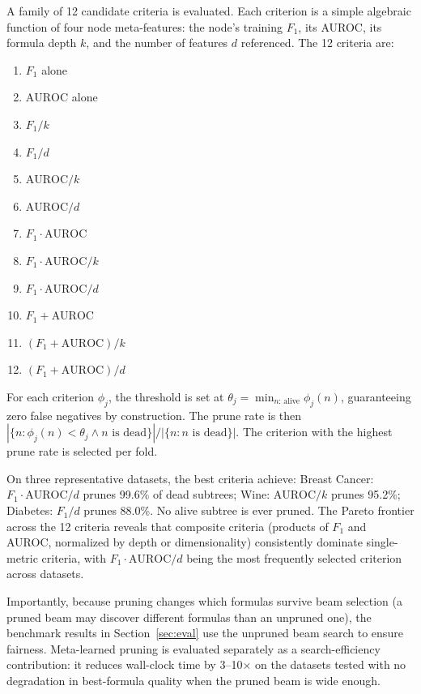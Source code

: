 \documentclass[journal]{IEEEtran}
\begin{document}
A family of 12 candidate criteria is evaluated.  Each criterion is a
simple algebraic function of four node meta-features: the node's
training $F_1$, its AUROC, its formula depth $k$, and the number of
features $d$ referenced.  The 12 criteria are:
\begin{enumerate}
\setlength{\itemsep}{0pt}
\item $F_1$ alone
\item $\text{AUROC}$ alone
\item $F_1 / k$
\item $F_1 / d$
\item $\text{AUROC} / k$
\item $\text{AUROC} / d$
\item $F_1 \cdot \text{AUROC}$
\item $F_1 \cdot \text{AUROC} / k$
\item $F_1 \cdot \text{AUROC} / d$
\item $F_1 + \text{AUROC}$
\item $(F_1 + \text{AUROC}) / k$
\item $(F_1 + \text{AUROC}) / d$
\end{enumerate}
For each criterion $\phi_j$, the threshold is set at
$\theta_j = \min_{n:\,\text{alive}} \phi_j(n)$, guaranteeing zero
false negatives by construction.  The prune rate is then
$|\{n : \phi_j(n) < \theta_j \land n\text{ is dead}\}| / |\{n : n\text{ is dead}\}|$.
The criterion with the highest prune rate is selected per fold.

On three representative datasets, the best criteria achieve:
Breast Cancer: $F_1 \cdot \text{AUROC}/d$ prunes 99.6\% of dead
subtrees; Wine: $\text{AUROC}/k$ prunes 95.2\%; Diabetes:
$F_1/d$ prunes 88.0\%.  No alive subtree is ever pruned.  The
Pareto frontier across the 12 criteria reveals that composite
criteria (products of $F_1$ and AUROC, normalized by depth or
dimensionality) consistently dominate single-metric criteria, with
$F_1 \cdot \text{AUROC}/d$ being the most frequently selected
criterion across datasets.

Importantly, because pruning changes which formulas survive beam
selection (a pruned beam may discover different formulas than an
unpruned one), the benchmark results in Section~\ref{sec:eval} use
the unpruned beam search to ensure fairness.  Meta-learned pruning
is evaluated separately as a search-efficiency contribution: it
reduces wall-clock time by 3--10$\times$ on the datasets tested
with no degradation in best-formula quality when the pruned beam
is wide enough.
\end{document}
